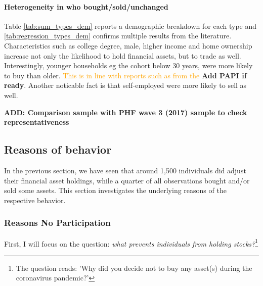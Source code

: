 \documentclass[ProjectABM]{subfiles}
\begin{document}
%



\paragraph{Heterogeneity in who bought/sold/unchanged}
Table \ref{tab:sum_types_dem} reports a demographic breakdown for each type and \ref{tab:regression_types_dem} confirms multiple results from the literature. Characteristics such as college degree, male, higher income and home ownership increase not only the likelihood to hold financial assets, but to trade as well. Interestingly, younger households eg the cohort below 30 years, were more likely to buy than older. \textcolor{orange}{This is in line with reports such as from the \cite{DAI_2021}} \textbf{Add PAPI if ready}. Another noticable fact is that self-employed were more likely to sell as well.






\textbf{ADD: Comparison sample with PHF wave 3 (2017) sample to check representativeness}
\subsection{Reasons of behavior}
In the previous section, we have seen that around 1,500 individuals did adjust their financial asset holdings, while a quarter of all observations bought and/or sold some assets. This section investigates the underlying reasons of the respective behavior.

\subsubsection{Reasons No Participation}
First, I will focus on the question: \textit{what prevents individuals from holding stocks?}\footnote{The question reads: 'Why did you decide not to buy any asset(s) during the coronavirus pandemic?'} 
\end{document}
